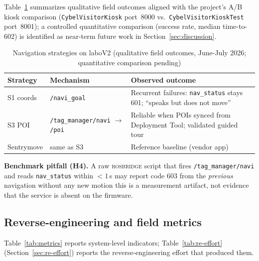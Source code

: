 \documentclass[conference]{IEEEtran}
\newcommand{\rosbridge}{\textsc{rosbridge}}
\begin{document}
Table~\ref{tab:navcompare} summarizes qualitative field outcomes aligned with the project's A/B kiosk comparison (\texttt{CybelVisitorKiosk} port~8000 vs.\ \texttt{CybelVisitorKioskTest} port~8001); a controlled quantitative comparison (success rate, median time-to-602) is identified as near-term future work in Section~\ref{sec:discussion}.

\begin{table}[!t]
\caption{Navigation strategies on laboV2 (qualitative field outcomes, June-July 2026; quantitative comparison pending)}
\label{tab:navcompare}
\centering
\scriptsize
\setlength{\tabcolsep}{3pt}
\begin{tabular}{@{}p{2.5cm}p{2.2cm}p{2.5cm}@{}}
\toprule
\textbf{Strategy} & \textbf{Mechanism} & \textbf{Observed outcome} \\
\midrule
S1 coords & \texttt{/navi\_goal} & Recurrent failures: \texttt{nav\_status} stays 601; ``speaks but does not move'' \\[2pt]
S3 POI & \texttt{/tag\_manager/\allowbreak{}navi} $\rightarrow$ \texttt{/poi} & Reliable when POIs synced from Deployment Tool; validated guided tour \\[2pt]
Sentrymove & same as S3 & Reference baseline (vendor app) \\
\bottomrule
\end{tabular}
\end{table}

\textbf{Benchmark pitfall (H4).} A raw \rosbridge{} script that fires \texttt{/tag\_manager/navi} and reads \texttt{nav\_status} within ${<}1$\,s may report code 603 from the \emph{previous} navigation without any new motion this is a measurement artifact, not evidence that the service is absent on the firmware.

\subsection{Reverse-engineering and field metrics}

Table~\ref{tab:metrics} reports system-level indicators; Table~\ref{tab:re-effort} (Section~\ref{sec:re-effort}) reports the reverse-engineering effort that produced them.
\end{document}
